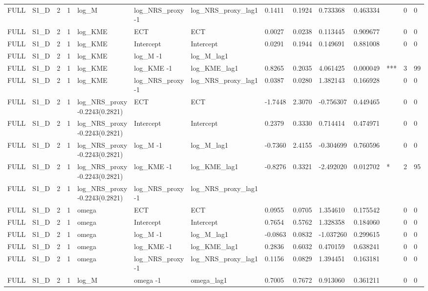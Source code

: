 \begin{tabular}{llllllllllllll}
FULL & S1\_D & 2 & 1 & log\_M & log\_NRS\_proxy -1 & log\_NRS\_proxy\_lag1 & 0.1411 & 0.1924 & 0.733368 & 0.463334 &  & 0 & 0 \\
FULL & S1\_D & 2 & 1 & log\_KME & ECT & ECT & 0.0027 & 0.0238 & 0.113445 & 0.909677 &  & 0 & 0 \\
FULL & S1\_D & 2 & 1 & log\_KME & Intercept & Intercept & 0.0291 & 0.1944 & 0.149691 & 0.881008 &  & 0 & 0 \\
FULL & S1\_D & 2 & 1 & log\_KME & log\_M -1 & log\_M\_lag1 &  &  &  &  &  &  &  \\
FULL & S1\_D & 2 & 1 & log\_KME & log\_KME -1 & log\_KME\_lag1 & 0.8265 & 0.2035 & 4.061425 & 0.000049 & *** & 3 & 99 \\
FULL & S1\_D & 2 & 1 & log\_KME & log\_NRS\_proxy -1 & log\_NRS\_proxy\_lag1 & 0.0387 & 0.0280 & 1.382143 & 0.166928 &  & 0 & 0 \\
FULL & S1\_D & 2 & 1 & log\_NRS\_proxy -0.2243(0.2821) & ECT & ECT & -1.7448 & 2.3070 & -0.756307 & 0.449465 &  & 0 & 0 \\
FULL & S1\_D & 2 & 1 & log\_NRS\_proxy -0.2243(0.2821) & Intercept & Intercept & 0.2379 & 0.3330 & 0.714414 & 0.474971 &  & 0 & 0 \\
FULL & S1\_D & 2 & 1 & log\_NRS\_proxy -0.2243(0.2821) & log\_M -1 & log\_M\_lag1 & -0.7360 & 2.4155 & -0.304699 & 0.760596 &  & 0 & 0 \\
FULL & S1\_D & 2 & 1 & log\_NRS\_proxy -0.2243(0.2821) & log\_KME -1 & log\_KME\_lag1 & -0.8276 & 0.3321 & -2.492020 & 0.012702 & * & 2 & 95 \\
FULL & S1\_D & 2 & 1 & log\_NRS\_proxy -0.2243(0.2821) & log\_NRS\_proxy -1 & log\_NRS\_proxy\_lag1 &  &  &  &  &  &  &  \\
FULL & S1\_D & 2 & 1 & omega & ECT & ECT & 0.0955 & 0.0705 & 1.354610 & 0.175542 &  & 0 & 0 \\
FULL & S1\_D & 2 & 1 & omega & Intercept & Intercept & 0.7654 & 0.5762 & 1.328358 & 0.184060 &  & 0 & 0 \\
FULL & S1\_D & 2 & 1 & omega & log\_M -1 & log\_M\_lag1 & -0.0863 & 0.0832 & -1.037260 & 0.299615 &  & 0 & 0 \\
FULL & S1\_D & 2 & 1 & omega & log\_KME -1 & log\_KME\_lag1 & 0.2836 & 0.6032 & 0.470159 & 0.638241 &  & 0 & 0 \\
FULL & S1\_D & 2 & 1 & omega & log\_NRS\_proxy -1 & log\_NRS\_proxy\_lag1 & 0.1156 & 0.0829 & 1.394451 & 0.163181 &  & 0 & 0 \\
FULL & S1\_D & 2 & 1 & log\_M & omega -1 & omega\_lag1 & 0.7005 & 0.7672 & 0.913060 & 0.361211 &  & 0 & 0 \\

\end{tabular}

